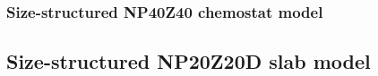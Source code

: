\documentclass[journal abbreviation, manuscript]{copernicus}
\begin{document}
\subsubsection{Size-structured NP40Z40 chemostat model}

\subsection{Size-structured NP20Z20D slab model}
\end{document}
